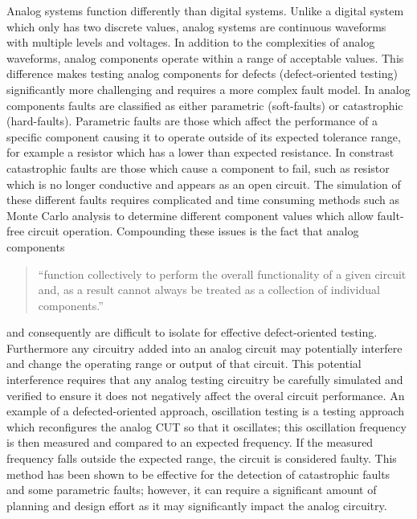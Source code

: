 \documentclass[12pt]{report}
\begin{document}
Analog systems function differently than digital systems.  Unlike a digital system which only has two discrete values, analog systems are continuous waveforms with multiple levels and voltages\cite{syschip}.  In addition to the complexities of analog waveforms, analog components operate within a range of acceptable values\cite{syschip}.  This difference makes testing analog components for defects (defect-oriented testing) significantly more challenging and requires a more complex fault model.  In analog components faults are classified as either parametric (soft-faults) or catastrophic (hard-faults)\cite{analogfaults}.  Parametric faults are those which affect the performance of a specific component causing it to operate outside of its expected tolerance range, for example a resistor which has a lower than expected resistance.  In constrast catastrophic faults are those which cause a component to fail, such as resistor which is no longer conductive and appears as an open circuit\cite{analogfaults}.  The simulation of these different faults requires complicated and time consuming methods such as Monte Carlo analysis to determine different component values which allow fault-free circuit operation\cite{syschip}.  Compounding these issues is the fact that analog components
\begin{quote}
``function collectively to perform the overall functionality of a given circuit and, as a result cannot always be treated as a collection of individual components\cite{syschip}.''
\end{quote}
and consequently are difficult to isolate for effective defect-oriented testing\cite{analogmixedtest}.  Furthermore any circuitry added into an analog circuit may potentially interfere and change the operating range or output of that circuit\cite{syschip}.  This potential interference requires that any analog testing circuitry be carefully simulated and verified to ensure it does not negatively affect the overal circuit performance.  An example of a defected-oriented approach, oscillation testing is a testing approach which reconfigures the analog CUT so that it oscillates; this oscillation frequency is then measured and compared to an expected frequency.  If the measured frequency falls outside the expected range, the circuit is considered faulty\cite{analogosc}.  This method has been shown to be effective for the detection of catastrophic faults and some parametric faults; however, it can require a significant amount of planning and design effort as it may significantly impact the analog circuitry\cite{analogosc}\cite{syschip}.
\end{document}
